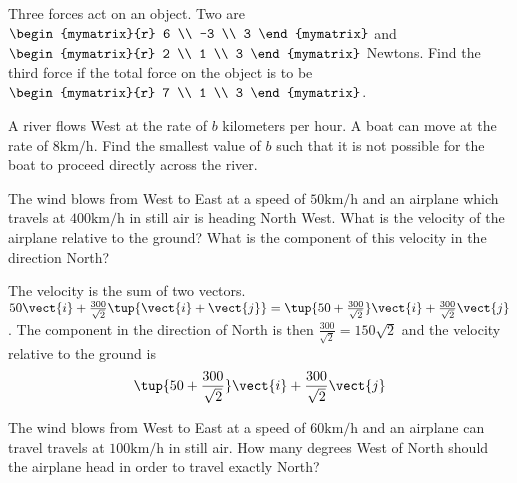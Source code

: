 \begin{enumialphparenastyle}
\begin{ex} Three forces act on an object. Two are $\begin{mymatrix}{r}
6 \\
-3 \\
3
\end{mymatrix} $ and $\begin{mymatrix}{r}
2 \\
1 \\
3
\end{mymatrix} $ Newtons. Find the third force if the total force on the object is
to be $\begin{mymatrix}{r}
7 \\
1 \\
3
\end{mymatrix} $. \vspace{1mm}
\end{ex}

\begin{ex} A river flows West at the rate of $b$ kilometers per hour. A boat can move
at the rate of $8\textrm{km}/\textrm{h}$. Find the smallest value of $b$ such that
it is not possible for the boat to proceed directly across the river.
\vspace{1mm}
\end{ex}

\begin{ex} The wind blows from West to East at a speed of $50\textrm{km}/\textrm{h}$ and
an airplane which travels at $400\textrm{km}/\textrm{h}$ in still air is heading
North West. What is the velocity of the airplane relative to the ground?
What is the component of this velocity in the direction North? \vspace{1mm}
\begin{sol}
The velocity is the sum of two vectors. $50\vect{i}+\frac{
300}{\sqrt{2}} \tup{\vect{i}+\vect{j}} =\tup{50+\frac{300}{\sqrt{2}}
} \vect{i}+ \frac{300}{\sqrt{2}}\vect{j}$. The component in the
direction of North is then $\frac{300}{\sqrt{2}}= 150\sqrt{2}$
and the velocity relative to the ground is
\[
\tup{50+\frac{300}{\sqrt{2}}} \vect{i}+\frac{300}{\sqrt{2}}\vect{j}
\]
\end{sol}
\end{ex}

\begin{ex} The wind blows from West to East at a speed of $60\textrm{km}/\textrm{h}$ and
an airplane can travel travels at $100\textrm{km}/\textrm{h}$ in still air. How
many degrees West of North should the airplane head in order to travel
exactly North? \vspace{1mm}
\end{ex}



\end{enumialphparenastyle}
